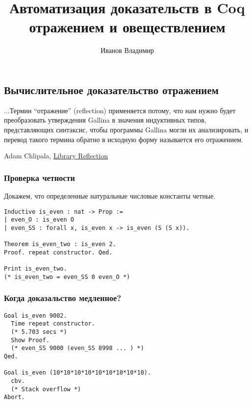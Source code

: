\documentclass{beamer}
\title{Автоматизация доказательств в Coq отражением и овеществлением}
\author{Иванов Владимир}
\institute{Huawei Technologies\\
  Moscow Research Center\\
  Advanced Software Technology Lab
}
\date{}
\begin{document}
\begin{frame}
  \maketitle
\end{frame}

\begin{frame}
  \section{Вычислительное доказательство отражением}
  \setlength{\epigraphwidth}{\textwidth}
  \epigraph{
    $\ldots$Термин ``отражение'' (reflection) применяется потому, что нам нужно будет преобразовать утверждения Gallina в значения индуктивных типов, представляющих синтаксис, чтобы программы Gallina могли их анализировать, и перевод такого термина обратно в исходную форму называется его отражением.
  }{Adam Chlipala,  \href{http://adam.chlipala.net/cpdt/html/Reflection.html}{Library Reflection}}
\end{frame}

\begin{frame}[fragile]
  \frametitle{Проверка четности}
  Докажем, что определенные натуральные числовые константы четные\footnotemark.
\begin{verbatim}
Inductive is_even : nat -> Prop :=
| even_O : is_even O
| even_SS : forall x, is_even x -> is_even (S (S x)).

Theorem is_even_two : is_even 2.
Proof. repeat constructor. Qed.

Print is_even_two.
(* is_even_two = even_SS 0 even_O *)
\end{verbatim}
  \vspace{1.5em}

\end{frame}

\begin{frame}[fragile]
  \frametitle{Когда доказальство медленное?}
\begin{verbatim}
Goal is_even 9002.
  Time repeat constructor.
  (* 5.703 secs *)
  Show Proof.
  (* even_SS 9000 (even_SS 8998 ... ) *)
Qed.

Goal is_even (10*10*10*10*10*10*10*10*10).
  cbv.
  (* Stack overflow *)
Abort.
\end{verbatim}
\end{frame}
\end{document}
